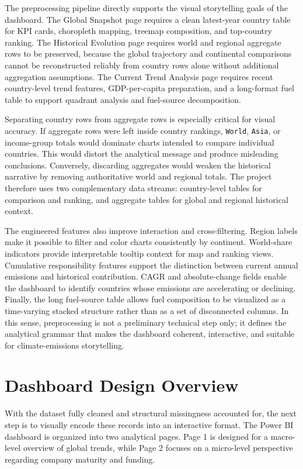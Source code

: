 \documentclass[a4paper,12pt]{article}
\begin{document}
The preprocessing pipeline directly supports the visual storytelling goals of the
dashboard. The Global Snapshot page requires a clean latest-year country table for KPI
cards, choropleth mapping, treemap composition, and top-country ranking. The Historical
Evolution page requires world and regional aggregate rows to be preserved, because the
global trajectory and continental comparisons cannot be reconstructed reliably from
country rows alone without additional aggregation assumptions. The Current Trend Analysis
page requires recent country-level trend features, GDP-per-capita preparation, and a
long-format fuel table to support quadrant analysis and fuel-source decomposition.

Separating country rows from aggregate rows is especially critical for visual accuracy.
If aggregate rows were left inside country rankings, \texttt{World}, \texttt{Asia}, or
income-group totals would dominate charts intended to compare individual countries. This
would distort the analytical message and produce misleading conclusions. Conversely,
discarding aggregates would weaken the historical narrative by removing authoritative
world and regional totals. The project therefore uses two complementary data streams:
country-level tables for comparison and ranking, and aggregate tables for global and
regional historical context.

The engineered features also improve interaction and cross-filtering. Region labels make
it possible to filter and color charts consistently by continent. World-share indicators
provide interpretable tooltip context for map and ranking views. Cumulative responsibility
features support the distinction between current annual emissions and historical
contribution. CAGR and absolute-change fields enable the dashboard to identify countries
whose emissions are accelerating or declining. Finally, the long fuel-source table allows
fuel composition to be visualized as a time-varying stacked structure rather than as a
set of disconnected columns. In this sense, preprocessing is not a preliminary technical
step only; it defines the analytical grammar that makes the dashboard coherent,
interactive, and suitable for climate-emissions storytelling.


\section{Dashboard Design Overview}
With the dataset fully cleaned and structural missingness accounted for, the next step is to visually encode these records into an interactive format. The Power BI dashboard is organized into two analytical pages. Page 1 is designed for a macro-level overview of global trends, while Page 2 focuses on a micro-level perspective regarding company maturity and funding.
\end{document}
